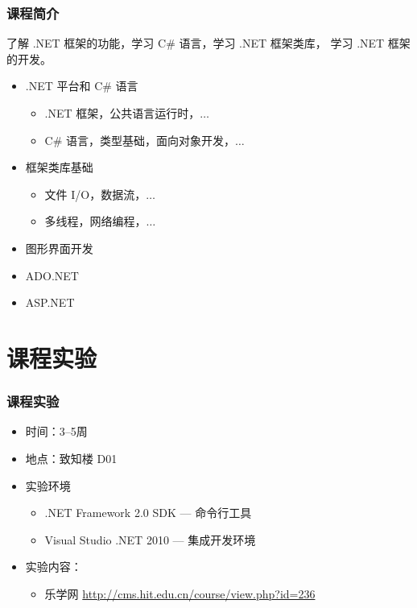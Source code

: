 \begin{frame}
\frametitle{课程简介}

\CJKindent 了解 .NET 框架的功能，学习 C\# 语言，学习 .NET 框架类库， 学习
.NET 框架的开发。

\begin{itemize}
\item .NET 平台和 C\# 语言
\begin{itemize}
\item .NET 框架，公共语言运行时，$\ldots$
\item C\# 语言，类型基础，面向对象开发，$\ldots$
\end{itemize}
\item 框架类库基础
  \begin{itemize}
  \item 文件 I/O，数据流，$\ldots$
  \item 多线程，网络编程，$\ldots$
  \end{itemize}
\item 图形界面开发
\item ADO.NET
\item ASP.NET
\end{itemize}
\end{frame}

\section{课程实验}
\begin{frame}
\frametitle{课程实验}
\begin{itemize}
    \setlength{\itemsep}{14pt plus 1pt}
 \item 时间：3--5周
\item 地点：致知楼 D01
\item 实验环境
\begin{itemize}
    \setlength{\itemsep}{6pt plus 1pt}
\item .NET Framework 2.0 SDK --- 命令行工具
\item Visual Studio .NET 2010 --- 集成开发环境
\end{itemize}
\item 实验内容：
  \begin{itemize}
  \item 乐学网 \href{http://cms.hit.edu.cn/course/view.php?id=236}{http://cms.hit.edu.cn/course/view.php?id=236}
  \end{itemize}
\end{itemize}

\end{frame}

